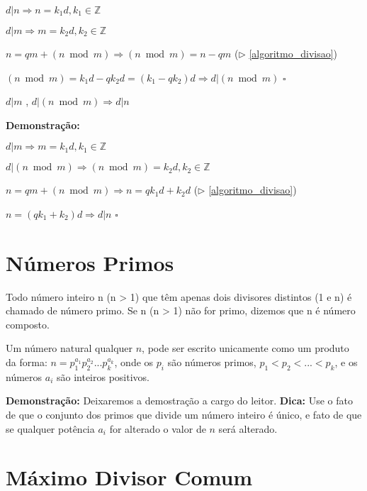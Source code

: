 $d|n \Rightarrow n = k_1d, k_1 \in \mathbb{Z}$

$d|m \Rightarrow m = k_2d, k_2 \in \mathbb{Z}$

$n = qm + (n \bmod m) \Rightarrow (n \bmod m) = n - qm$ ($\triangleright$ \autoref{algoritmo_divisao})

$(n \bmod m) = k_1d - qk_2d = (k_1 - qk_2)d \Rightarrow d|(n \bmod m)$ $\square$


\begin{corollary}\label{divisibilidade_modular2}
$d|m$ , $d|(n \bmod m) \Rightarrow d|n$
\end{corollary}
\textbf{Demonstração:}

$d|m \Rightarrow m = k_1d, k_1 \in \mathbb{Z}$

$d|(n \bmod m) \Rightarrow (n \bmod m) = k_2d, k_2 \in \mathbb{Z}$

$n = qm + (n \bmod m) \Rightarrow n = qk_1d + k_2d$ ($\triangleright$ \autoref{algoritmo_divisao})

$n = (qk_1 + k_2)d \Rightarrow d|n$ $\square$

\section{Números Primos}

\begin{definition} 
Todo número inteiro n (n > 1) que têm apenas dois divisores distintos (1 e n) é chamado de número primo. Se n (n > 1) não for primo, dizemos que n é número composto.
\end{definition}

\begin{theorem}\label{fatoracao_unica}
Um número natural qualquer $n$, pode ser escrito unicamente como um produto da forma: 
$n = p_1^{a_1}p_2^{a_2}...p_k^{a_k}$, onde os $p_i$ são números primos, $p_1 < p_2 < ... < p_k$, e os números $a_i$ são inteiros positivos.
\end{theorem}
\textbf{Demonstração:}
Deixaremos a demostração a cargo do leitor.
\textbf{Dica:} Use o fato de que o conjunto dos primos que divide um número inteiro é único, e fato de que se qualquer potência $a_i$ for alterado o valor de $n$ será alterado.


\section{Máximo Divisor Comum}

